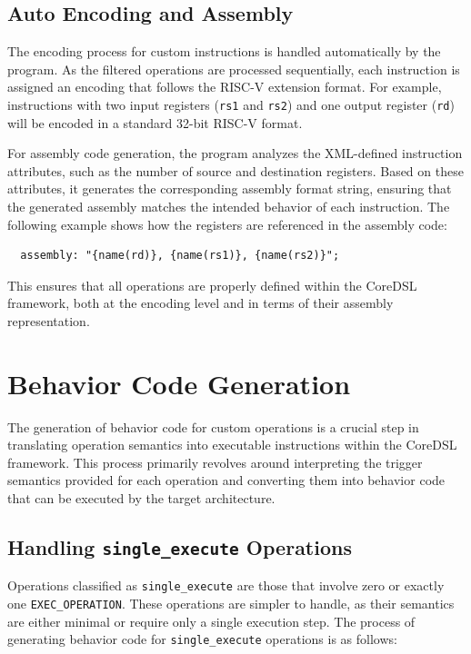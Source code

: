 \subsection{Auto Encoding and Assembly}

The encoding process for custom instructions is handled automatically by the program. As the filtered operations are processed sequentially, each instruction is assigned an encoding that follows the RISC-V extension format. For example, instructions with two input registers (\texttt{rs1} and \texttt{rs2}) and one output register (\texttt{rd}) will be encoded in a standard 32-bit RISC-V format.

For assembly code generation, the program analyzes the XML-defined instruction attributes, such as the number of source and destination registers. Based on these attributes, it generates the corresponding assembly format string, ensuring that the generated assembly matches the intended behavior of each instruction. The following example shows how the registers are referenced in the assembly code:

\begin{lstlisting}
  assembly: "{name(rd)}, {name(rs1)}, {name(rs2)}";
\end{lstlisting}

This ensures that all operations are properly defined within the CoreDSL framework, both at the encoding level and in terms of their assembly representation.

\section{Behavior Code Generation}

The generation of behavior code for custom operations is a crucial step in translating operation semantics into executable instructions within the CoreDSL framework. This process primarily revolves around interpreting the trigger semantics provided for each operation and converting them into behavior code that can be executed by the target architecture.

\subsection{Handling \texttt{single\_execute} Operations}

Operations classified as \texttt{single\_execute} are those that involve zero or exactly one \texttt{EXEC\_OPERATION}. These operations are simpler to handle, as their semantics are either minimal or require only a single execution step. The process of generating behavior code for \texttt{single\_execute} operations is as follows:

